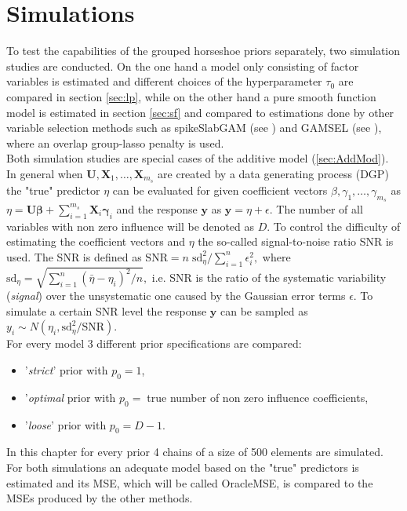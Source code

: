 \documentclass[12pt,letterpaper]{article}
\numberwithin{equation}{subsection}
\begin{document}
\section{Simulations}
\label{sec:sim}
To test the capabilities of the grouped horseshoe priors separately, two simulation studies are conducted. On the one hand a model only consisting of factor variables is estimated and different choices of the hyperparameter $\tau_0$ are compared in section \ref{sec:lp}, while on the other hand a pure smooth function model is estimated in section \ref{sec:sf} and compared to estimations done by other variable selection methods such as spikeSlabGAM (see \cite{scheipl}) and GAMSEL (see \cite{gamsel}), where an overlap group-lasso penalty is used. \\
Both simulation studies are special cases of the additive model (\ref{sec:AddMod}). In general when $\mathbf{U}, \mathbf{X}_1,\dots ,\mathbf{X}_{m_s}$ are created by a data generating process (DGP) the "true" predictor $\eta$ can be evaluated for given coefficient vectors $\beta, \gamma_1 ,\dots ,\gamma_{m_s}$ as $\eta = \mathbf{U}\mathbf{\beta} +  \sum^{m_s}_{i=1} \mathbf{X}_i\mathbf{\gamma}_i$ and the response $\mathbf{y}$ as $\mathbf{y} = \eta + \epsilon$. The number of all variables with non zero influence will be denoted as $D$. To control the difficulty of estimating the coefficient vectors and $\eta$ the so-called signal-to-noise ratio SNR is used. The SNR is defined as $\text{SNR} = n \;\text{sd}^2_\eta / \sum^n_{i=1}\epsilon^2_i,$ where $\text{sd}_\eta = \sqrt{\sum^n_{i=1}(\bar{\eta} -\eta_i)^2/n},$ i.e. SNR is the ratio of the systematic variability (\textit{signal}) over the unsystematic one caused by the Gaussian error terms $\epsilon$.
To simulate a certain SNR level the response $\mathbf{y}$ can be sampled as $y_i \sim N(\eta_i , \text{sd}_\eta^2 / \text{SNR})$. \\
For every model 3 different prior specifications are compared:
\begin{itemize}
\item '\textit{strict}' prior with $p_0 = 1$,
\item '\textit{optimal} prior with $p_0 = \;$true number of non zero influence coefficients,
\item '\textit{loose}' prior with $p_0 = D-1$.
\end{itemize}
In this chapter for every prior 4 chains of a size of 500 elements are simulated. For both simulations an adequate model based on the "true" predictors is estimated and its MSE, which will be called OracleMSE, is compared to the MSEs produced by the other methods.
\newpage
\end{document}
